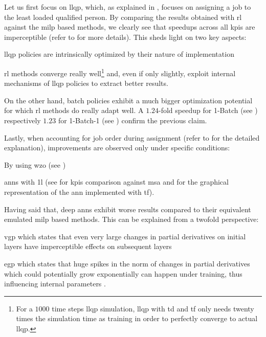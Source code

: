 Let us first focus on \gls{llqp}, which, as explained in , focuses on assigning a job to the least loaded qualified person. By comparing the results obtained with \gls{rl} against the \gls{milp} based methods, we clearly see that speedups across all \glspl{kpi} are imperceptible (refer to  for more details). This sheds light on two key aspects:
\begin{enumerate*}
	\item \gls{llqp} policies are intrinsically optimized by their nature of implementation
	\item \gls{rl} methods converge really well\footnote{For a $1000$ time steps \gls{llqp} simulation, \gls{llqp} with \gls{td} and \gls{tf} only needs twenty times the simulation time as training in order to perfectly converge to actual \gls{llqp}.} and, even if only slightly, exploit internal mechanisms of \gls{llqp} policies to extract better results.
\end{enumerate*}

On the other hand, batch policies exhibit a much bigger optimization potential for which \gls{rl} methods do really adapt well. A $1.24$-fold speedup for 1-Batch (see ) respectively $1.23$ for 1-Batch-1 (see ) confirm the previous claim.

Lastly, when accounting for job order during assignment (refer to  for the detailed explanation), improvements are observed only under specific conditions:
\begin{enumerate*}
	\item By using \gls{wzo} (see ) 
	\item \glspl{ann} with \gls{1l} (see  for \glspl{kpi} comparison against \gls{msa} and  for the graphical representation of the \gls{ann} implemented with \gls{tf}).
\end{enumerate*}

Having said that, deep \glspl{ann} exhibit worse results compared to their equivalent emulated \gls{milp} based methods. This can be explained from a twofold perspective:
\begin{enumerate*}
	\item \gls{vgp} which states that even very large changes in partial derivatives on initial layers have imperceptible effects on subsequent layers \citep{Bengio1994}
	\item \gls{egp} which states that huge spikes in the norm of changes in partial derivatives which could potentially grow exponentially can happen under training, thus influencing internal parameters \citep{Bengio1994,Pascanu2012}.
\end{enumerate*}

